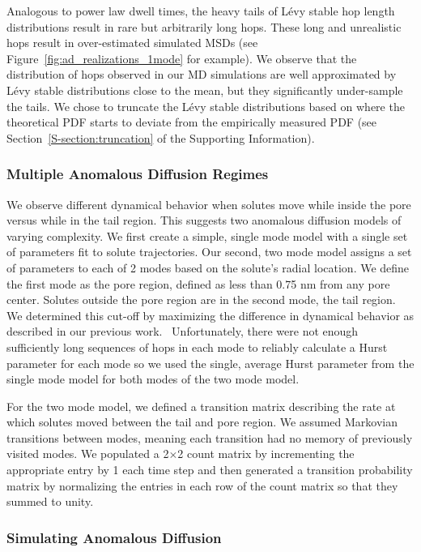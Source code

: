 \documentclass[journal=jctcce,manuscript=article]{achemso}
\begin{document}
  Analogous to power law dwell times, the heavy tails of L\'evy stable hop
  length distributions result in rare but arbitrarily long hops. These long and
  unrealistic hops result in over-estimated simulated MSDs (see
  Figure~\ref{fig:ad_realizations_1mode} for example). We observe that the
  distribution of hops observed in our MD simulations are well approximated by
  L\'evy stable distributions close to the mean, but they significantly
  under-sample the tails. We chose to truncate the L\'evy stable distributions
  based on where the theoretical PDF starts
  to deviate from the empirically measured PDF (see
  Section~\ref{S-section:truncation} of the Supporting Information).~\cite{mantegna_stochastic_1994}

  \subsubsection*{Multiple Anomalous Diffusion Regimes}
  
  We observe different dynamical behavior when solutes move while inside the
  pore versus while in the tail region. This suggests two anomalous diffusion
  models of varying complexity. We first create a simple, single mode model
  with a single set of parameters fit to solute trajectories. Our second, two
  mode model assigns a set of parameters to each of 2 modes based on the
  solute's radial location. We define the first mode as the pore region,
  defined as less than 0.75 nm from any pore center. Solutes outside the pore
  region are in the second mode, the tail region. We determined this cut-off by
  maximizing the difference in dynamical behavior as described in our previous
  work.~\cite{coscia_chemically_2019} Unfortunately, there were not enough
  sufficiently long sequences of hops in each mode to reliably calculate a
  Hurst parameter for each mode so we used the single, average Hurst parameter
  from the single mode model for both modes of the two mode model.
 
  For the two mode model, we defined a transition matrix describing the rate at
  which solutes moved between the tail and pore region. We assumed Markovian
  transitions between modes, meaning each transition had no memory of
  previously visited modes. We populated a 2$\times$2 count matrix by
  incrementing the appropriate entry by 1 each time step and then generated a
  transition probability matrix by normalizing the entries in each row of the
  count matrix so that they summed to unity.
  
  \subsubsection*{Simulating Anomalous Diffusion}
\end{document}
